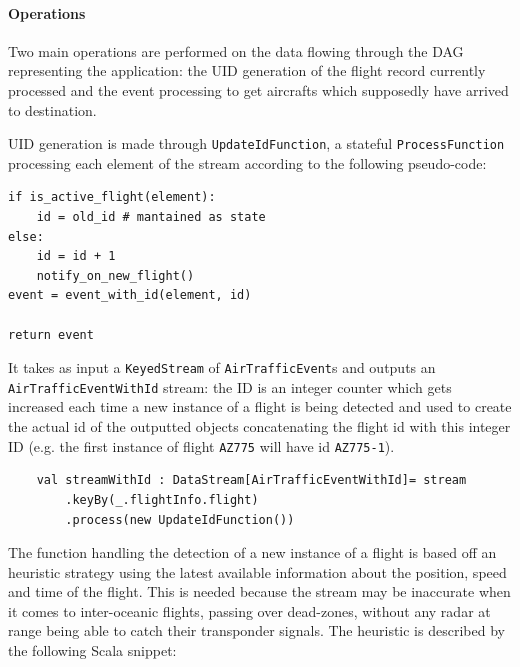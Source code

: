 \paragraph{Operations}

Two main operations are performed on the data flowing through the DAG representing the application: the UID generation of the flight record currently processed and the event processing to get aircrafts which supposedly have arrived to destination.

UID generation is made through \texttt{UpdateIdFunction}, a stateful \texttt{ProcessFunction} processing each element of the stream according to the following pseudo-code:

\begin{verbatim}
if is_active_flight(element):
    id = old_id # mantained as state
else:
    id = id + 1
    notify_on_new_flight()
event = event_with_id(element, id)

return event
\end{verbatim}

It takes as input a \texttt{KeyedStream} of \texttt{AirTrafficEvent}s and outputs an \texttt{AirTrafficEventWithId} stream: the ID is an integer counter which gets increased each time a new instance of a flight is being detected and used to create the actual id of the outputted objects concatenating the flight id with this integer ID (e.g. the first instance of flight \texttt{AZ775} will have id \texttt{AZ775-1}). 

\begin{code}
    \begin{verbatim}
    val streamWithId : DataStream[AirTrafficEventWithId]= stream
        .keyBy(_.flightInfo.flight)
        .process(new UpdateIdFunction())
    \end{verbatim}
\end{code}

The function handling the detection of a new instance of a flight is based off an heuristic strategy using the latest available information about the position, speed and time of the flight. This is needed because the stream may be inaccurate when it comes to inter-oceanic flights, passing over dead-zones, without any radar at range being able to catch their transponder signals. The heuristic is described by the following Scala snippet:

